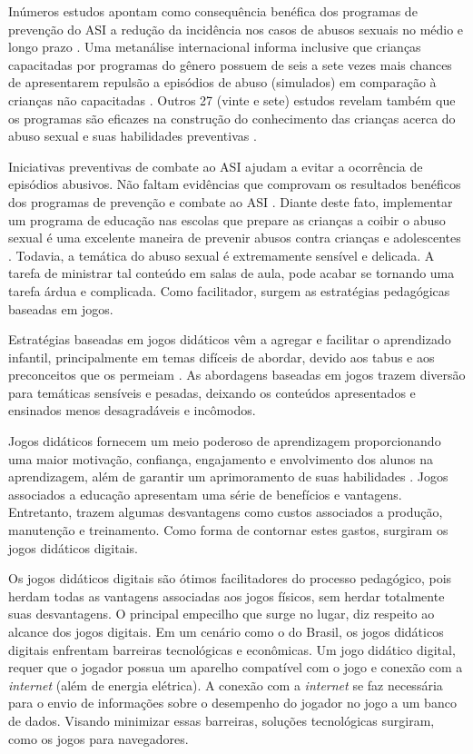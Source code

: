 Inúmeros estudos apontam como consequência benéfica dos programas de prevenção do \ac{ASI} a redução da incidência nos casos de abusos sexuais no médio e longo prazo \cite{maria2010papel}. Uma metanálise internacional informa inclusive que crianças capacitadas por programas do gênero possuem de seis a sete vezes mais chances de apresentarem repulsão a episódios de abuso (simulados) em comparação à crianças não capacitadas \cite{finkelhor2009prevention}. Outros 27 (vinte e sete) estudos revelam também que os programas são eficazes na construção do conhecimento das crianças acerca do abuso sexual e suas habilidades preventivas \cite{collin2013lessons}. 

Iniciativas preventivas de combate ao \ac{ASI} ajudam a evitar a ocorrência de episódios abusivos. Não faltam evidências que comprovam os resultados benéficos dos programas de prevenção e combate ao \ac{ASI} \cite{maria2010papel}. Diante deste fato, implementar um programa de educação nas escolas que prepare as crianças a coibir o abuso sexual é uma excelente maneira de prevenir abusos contra crianças e adolescentes \cite{santos2009guia}. Todavia, a temática do abuso sexual é extremamente sensível e delicada. A tarefa de ministrar tal conteúdo em salas de aula, pode acabar se tornando uma tarefa árdua e complicada. Como facilitador, surgem as estratégias pedagógicas baseadas em jogos. 

Estratégias baseadas em jogos didáticos vêm a agregar e facilitar o aprendizado infantil, principalmente em temas difíceis de abordar, devido aos tabus e aos preconceitos que os permeiam \cite{miranda2018abordagem}. As abordagens baseadas em jogos trazem diversão para temáticas sensíveis e pesadas, deixando os conteúdos apresentados e ensinados menos desagradáveis e incômodos. 

Jogos didáticos fornecem um meio poderoso de aprendizagem proporcionando uma maior motivação, confiança, engajamento e envolvimento dos alunos na aprendizagem, além de garantir um aprimoramento de suas habilidades \cite{colleen2016advancing}. Jogos associados a educação apresentam uma série de benefícios e vantagens. Entretanto, trazem algumas desvantagens como custos associados a produção, manutenção e treinamento. Como forma de contornar estes gastos, surgiram os jogos didáticos digitais.

\pagebreak

Os jogos didáticos digitais são ótimos facilitadores do processo pedagógico, pois herdam todas as vantagens associadas aos jogos físicos, sem herdar totalmente suas desvantagens. O principal empecilho que surge no lugar, diz respeito ao alcance dos jogos digitais. Em um cenário como o do Brasil, os jogos didáticos digitais enfrentam barreiras tecnológicas e econômicas. Um jogo didático digital, requer que o jogador possua um aparelho compatível com o jogo e conexão com a \textit{internet} (além de energia elétrica). A conexão com a \textit{internet} se faz necessária para o envio de informações sobre o desempenho do jogador no jogo a um banco de dados. Visando minimizar essas barreiras, soluções tecnológicas surgiram, como os jogos para navegadores. 

